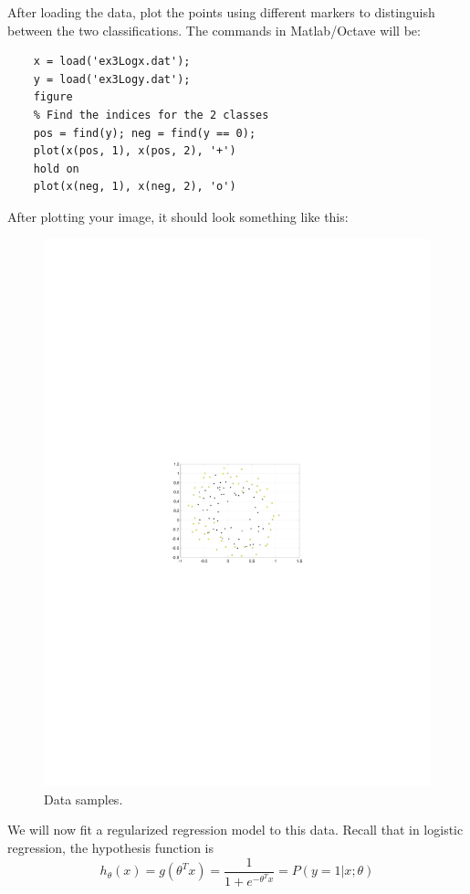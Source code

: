\documentclass[10pt,a4paper]{article}
\begin{document}
  After loading the data, plot the points using different markers to distinguish between the two classifications. The commands in Matlab/Octave will be:
  \begin{lstlisting}
    x = load('ex3Logx.dat'); 
    y = load('ex3Logy.dat');
    figure
    % Find the indices for the 2 classes
    pos = find(y); neg = find(y == 0);
    plot(x(pos, 1), x(pos, 2), '+')
    hold on
    plot(x(neg, 1), x(neg, 2), 'o')
  \end{lstlisting}
  After plotting your image, it should look something like this:
  \begin{figure}[htb!]
    \centering
      \includegraphics[width=.7\columnwidth]{datasamples2}
  \caption{Data samples.}
  \end{figure}


  We will now fit a regularized regression model to this data. Recall that in logistic regression, the hypothesis function is 
  \[ h_{\theta}(x) = g(\theta^{T}x) = \frac{{1}}{1+e^{-\theta^{T}x}} =  P(y=1\vert x;\theta) \]
\end{document}
